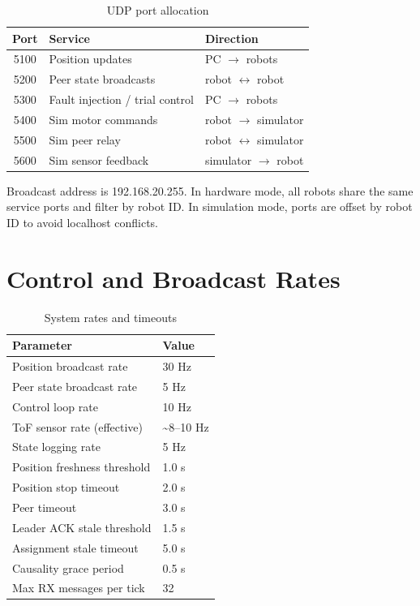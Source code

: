 \documentclass[a4paper,oneside,titlepage,11pt]{report}
\begin{document}
\begin{table}[H]
\centering
\caption{UDP port allocation}
\label{tab:udp_ports}
\begin{tabular}{cll}
\toprule
\textbf{Port} & \textbf{Service} & \textbf{Direction} \\
\midrule
5100 & Position updates & PC $\rightarrow$ robots \\
5200 & Peer state broadcasts & robot $\leftrightarrow$ robot \\
5300 & Fault injection / trial control & PC $\rightarrow$ robots \\
5400 & Sim motor commands & robot $\rightarrow$ simulator \\
5500 & Sim peer relay & robot $\leftrightarrow$ simulator \\
5600 & Sim sensor feedback & simulator $\rightarrow$ robot \\
\bottomrule
\end{tabular}
\end{table}

Broadcast address is 192.168.20.255. In hardware mode, all robots share the same service ports and filter by robot ID. In simulation mode, ports are offset by robot ID to avoid localhost conflicts.

\section{Control and Broadcast Rates}
\begin{table}[H]
\centering
\caption{System rates and timeouts}
\label{tab:rates_timeouts}
\begin{tabular}{ll}
\toprule
\textbf{Parameter} & \textbf{Value} \\
\midrule
Position broadcast rate & 30 Hz \\
Peer state broadcast rate & 5 Hz \\
Control loop rate & 10 Hz \\
ToF sensor rate (effective) & \textasciitilde 8--10 Hz \\
State logging rate & 5 Hz \\
Position freshness threshold & 1.0 s \\
Position stop timeout & 2.0 s \\
Peer timeout & 3.0 s \\
Leader ACK stale threshold & 1.5 s \\
Assignment stale timeout & 5.0 s \\
Causality grace period & 0.5 s \\
Max RX messages per tick & 32 \\
\bottomrule
\end{tabular}
\end{table}
\end{document}
